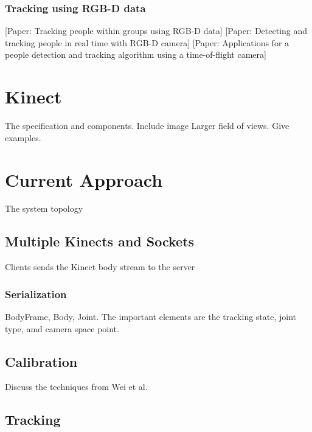 \documentclass{sigchi}
\begin{document}
\cite{wei_kinect_calibration}
\cite{eggert_four_algorithms}
\cite{horn_unit_quaternions}

\subsubsection{Tracking using RGB-D data}

[Paper: Tracking people within groups using RGB-D data]
[Paper: Detecting and tracking people in real time with RGB-D camera]
[Paper: Applications for a people detection and tracking algorithm using a time-of-flight camera]

\section{Kinect}

The specification and components. Include image Larger field of views. Give examples.

\section{Current Approach}

The system topology

\subsection{Multiple Kinects and Sockets}

Clients sends the Kinect body stream to the server

\subsubsection{Serialization}

BodyFrame, Body, Joint. The important elements are the tracking state, joint type, amd camera space point.

\cite{microsoft_kinect_namespace}
\cite{microsoft_kinect_coordinates}

\subsection{Calibration}

Discuss the techniques from Wei et al.

\subsection{Tracking}
\end{document}
